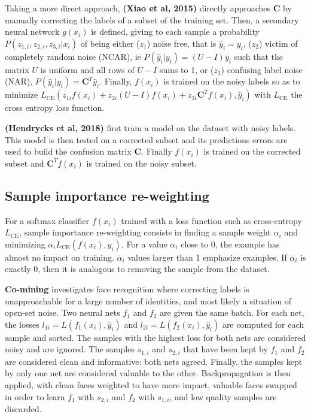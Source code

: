 Taking a more direct approach, \textbf{(Xiao et al, 2015)} \citep{MassiveNoisy} directly approaches $\textbf{C}$ by manually correcting the labels of a subset of the training set. Then, a secondary neural network $g(x_i)$ is defined, giving to each sample a probability $P(z_{1,i}, z_{2,i}, z_{3,i} | x_i)$ of being either ($z_1$) noise free, that is $\hat{y}_i = y_i$, ($z_2$) victim of completely random noise (NCAR), ie $P(\hat{y}_i | y_i) = (U-I)y_i$ such that the matrix $U$ is uniform and all rows of $U-I$ sums to 1, or ($z_3$) confusing label noise (NAR), $P(\hat{y}_i | y_i) = \textbf{C}^T\hat{y}_i$. Finally, $f(x_i)$ is trained on the noisy labels so as to minimize $L_\text{CE}(z_{1i} f(x_i) + z_{2i}(U-I)f(x_i) + z_{3i}\textbf{C}^Tf(x_i), \hat{y}_i)$ with $L_\text{CE}$ the cross entropy loss function.

\textbf{(Hendrycks et al, 2018)} \citep{Trusted} first train a model on the dataset with noisy labels. This model is then tested on a corrected subset and its predictions errors are used to build the confusion matrix $\textbf{C}$. Finally $f(x_i)$ is trained on the corrected subset and $\textbf{C}^Tf(x_i)$ is trained on the noisy subset.

\subsection{Sample importance re-weighting}

For a softmax classifier $f(x_i)$ trained with a loss function such as cross-entropy $L_{\text{CE}}$, sample importance re-weighting consists in finding a sample weight $\alpha_i$ and minimizing $\alpha_iL_\text{CE}(f(x_i), \hat{y}_i)$. For a value $\alpha_i$ close to 0, the example has almost no impact on training. $\alpha_i$ values larger than 1 emphasize examples. If $\alpha_i$ is exactly 0, then it is analogous to removing the sample from the dataset.

\textbf{Co-mining} \citep{CoMining} investigates face recognition where correcting labels is unapproachable for a large number of identities, and most likely a situation of open-set noise. Two neural nets $f_1$ and $f_2$ are given the same batch. For each net, the losses $l_{1i} = L(f_1(x_i), \hat{y}_i)$ and $l_{2i} = L(f_2(x_i), \hat{y}_i)$ are computed for each sample and sorted. The samples with the highest loss for both nets are considered noisy and are ignored. The samples $s_{1,i}$ and $s_{2,i}$ that have been kept by $f_1$ and $f_2$ are considered clean and informative: both nets agreed. Finally, the samples kept by only one net are considered valuable to the other. Backpropagation is then applied, with clean faces weighted to have more impact, valuable faces swapped in order to learn $f_1$ with $s_{2,i}$ and $f_2$ with $s_{1,i}$, and low quality samples are discarded.

